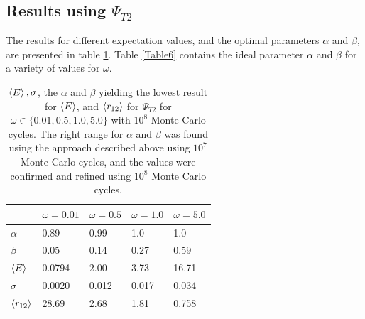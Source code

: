 \documentclass[10pt,a4paper]{article}
\begin{document}
\subsection{Results using $\Psi_{T2}$}
The results for different expectation values, and the optimal parameters $\alpha$ and $\beta$, are presented in table \ref{table3}. Table \ref{Table6} contains the ideal parameter $\alpha$ and $\beta$ for a variety of values for $\omega$.
\begin{table}[H]
\centering
\caption[$\braket{E},\sigma$, $\alpha$,$\beta$ and  $\braket{r_{12}}$]{$\braket{E},\sigma$, the $\alpha$ and $\beta$ yielding the lowest result for  $\braket{E}$, and $\braket{r_{12}}$ for $\Psi_{T2}$ for $\omega\in\{0.01,0.5,1.0,5.0\}$ with $10^8$ Monte Carlo cycles. The right range for $\alpha$ and $\beta$ was found using the approach described above using $10^7$ Monte Carlo cycles, and the values were confirmed and refined using  $10^8$ Monte Carlo cycles. }

\begin{tabular}{|l|l|l|l|l|}
\hline
                  & $\omega=0.01$ & $\omega=0.5$ & $\omega=1.0$ & $\omega=5.0$ \\ \hline
$\alpha$          & 0.89          & 0.99         & 1.0          & 1.0          \\ \hline
$\beta$           & 0.05          & 0.14         & 0.27         & 0.59         \\ \hline
$\braket{E}$      & 0.0794        & 2.00         & 3.73         & 16.71        \\ \hline
$\sigma$          & 0.0020        & 0.012        & 0.017        & 0.034        \\ \hline
$\braket{r_{12}}$ & 28.69         & 2.68         & 1.81         & 0.758        \\ \hline
\end{tabular}\label{table3}
\end{table}
\end{document}

